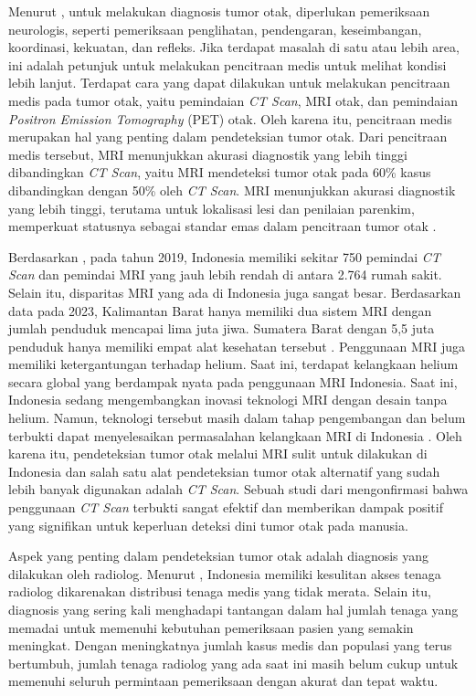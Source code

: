 Menurut \textcite{mayoclinic2019braintumor}, untuk melakukan diagnosis tumor otak, diperlukan pemeriksaan neurologis, seperti pemeriksaan penglihatan, pendengaran, keseimbangan, koordinasi, kekuatan, dan refleks. Jika terdapat masalah di satu atau lebih area, ini adalah petunjuk untuk melakukan pencitraan medis untuk melihat kondisi lebih lanjut. Terdapat cara yang dapat dilakukan untuk melakukan pencitraan medis pada tumor otak, yaitu pemindaian \textit{CT Scan}, MRI otak, dan pemindaian \textit{Positron Emission Tomography} (PET) otak. Oleh karena itu, pencitraan medis merupakan hal yang penting dalam pendeteksian tumor otak. Dari pencitraan medis tersebut, MRI menunjukkan akurasi diagnostik yang lebih tinggi dibandingkan \textit{CT Scan}, yaitu MRI mendeteksi tumor otak pada 60\% kasus dibandingkan dengan 50\% oleh \textit{CT Scan}. MRI menunjukkan akurasi diagnostik yang lebih tinggi, terutama untuk lokalisasi lesi dan penilaian parenkim, memperkuat statusnya sebagai standar emas dalam pencitraan tumor otak \cite{jaffar2025comparative}.

Berdasarkan \textcite{medtech2020hospitalintelligence}, pada tahun 2019, Indonesia memiliki sekitar 750 pemindai \textit{CT Scan} dan pemindai MRI yang jauh lebih rendah di antara 2.764 rumah sakit. Selain itu, disparitas MRI yang ada di Indonesia juga sangat besar. Berdasarkan data pada 2023, Kalimantan Barat hanya memiliki dua sistem MRI dengan jumlah penduduk mencapai lima juta jiwa. Sumatera Barat dengan 5,5 juta penduduk hanya memiliki empat alat kesehatan tersebut \cite{purnama2025disparitas}. Penggunaan MRI juga memiliki ketergantungan terhadap helium. Saat ini, terdapat kelangkaan helium secara global yang berdampak nyata pada penggunaan MRI Indonesia. Saat ini, Indonesia sedang mengembangkan inovasi teknologi MRI dengan desain tanpa helium. Namun, teknologi tersebut masih dalam tahap pengembangan dan belum terbukti dapat menyelesaikan permasalahan kelangkaan MRI di Indonesia \cite{permana2025kelangkaan}. Oleh karena itu, pendeteksian tumor otak melalui MRI sulit untuk dilakukan di Indonesia dan salah satu alat pendeteksian tumor otak alternatif yang sudah lebih banyak digunakan adalah \textit{CT Scan}.  Sebuah studi dari \textcite{budiman2024effectiveness} mengonfirmasi bahwa penggunaan \textit{CT Scan} terbukti sangat efektif dan memberikan dampak positif yang signifikan untuk keperluan deteksi dini tumor otak pada manusia.

Aspek yang penting dalam pendeteksian tumor otak adalah diagnosis yang dilakukan oleh radiolog. Menurut \textcite{nuraini2024kesulitan}, Indonesia memiliki kesulitan akses tenaga radiolog dikarenakan distribusi tenaga medis yang tidak merata. Selain itu, diagnosis yang sering kali menghadapi tantangan dalam hal jumlah tenaga yang memadai untuk memenuhi kebutuhan pemeriksaan pasien yang semakin meningkat. Dengan meningkatnya jumlah kasus medis dan populasi yang terus bertumbuh, jumlah tenaga radiolog yang ada saat ini masih belum cukup untuk memenuhi seluruh permintaan pemeriksaan dengan akurat dan tepat waktu.

